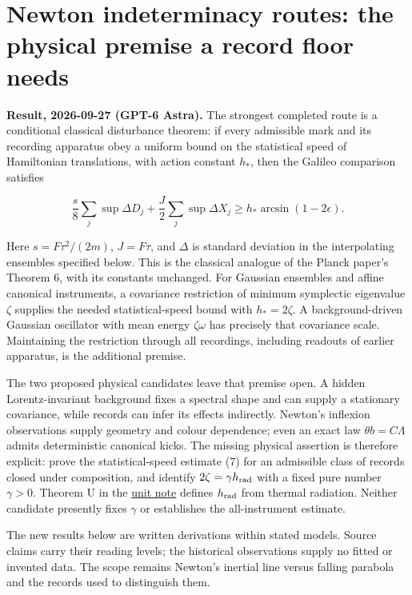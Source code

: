 \documentclass[11pt,a4paper]{article}
\begin{document}
\hypertarget{newton-indeterminacy-routes-the-physical-premise-a-record-floor-needs}{%
\section{Newton indeterminacy routes: the physical premise a record
floor
needs}\label{newton-indeterminacy-routes-the-physical-premise-a-record-floor-needs}}

\textbf{Result, 2026-09-27 (GPT-6 Astra).} The strongest completed route
is a conditional classical disturbance theorem: if every admissible mark
and its recording apparatus obey a uniform bound on the statistical
speed of Hamiltonian translations, with action constant \(h_*\), then
the Galileo comparison satisfies

\[\boxed{\frac s8\sum_j\sup\Delta D_j+\frac J2\sum_j\sup\Delta X_j
\ge h_*\arcsin(1-2\epsilon).} \tag{1}\]

Here \(s=F\tau^2/(2m)\), \(J=F\tau\), and \(\Delta\) is standard
deviation in the interpolating ensembles specified below. This is the
classical analogue of the Planck paper's Theorem 6, with its constants
unchanged. For Gaussian ensembles and affine canonical instruments, a
covariance restriction of minimum symplectic eigenvalue \(\zeta\)
supplies the needed statistical-speed bound with
\textbf{\(h_*=2\zeta\)}. A background-driven Gaussian oscillator with
mean energy \(\zeta\omega\) has precisely that covariance scale.
Maintaining the restriction through all recordings, including readouts
of earlier apparatus, is the additional premise.

The two proposed physical candidates leave that premise open. A hidden
Lorentz-invariant background fixes a spectral shape and can supply a
stationary covariance, while records can infer its effects indirectly.
Newton's inflexion observations supply geometry and colour dependence;
even an exact law \(\theta b=C\Lambda\) admits deterministic canonical
kicks. The missing physical assertion is therefore explicit: prove the
statistical-speed estimate (7) for an admissible class of records closed
under composition, and identify \(2\zeta=\gamma h_{\rm rad}\) with a
fixed pure number \(\gamma>0\). Theorem U in the
\href{necessity-unit-and-indeterminacy.md}{unit note} defines
\(h_{\rm rad}\) from thermal radiation. Neither candidate presently
fixes \(\gamma\) or establishes the all-instrument estimate.

The new results below are written derivations within stated models.
Source claims carry their reading levels; the historical observations
supply no fitted or invented data. The scope remains Newton's inertial
line versus falling parabola and the records used to distinguish them.
\end{document}
